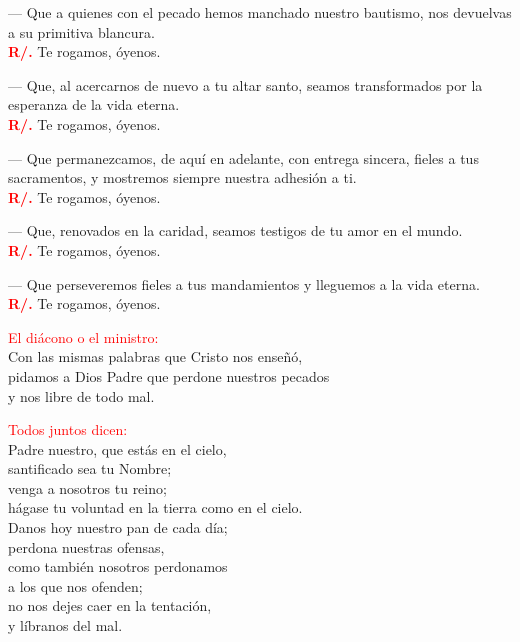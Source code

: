 \documentclass[12pt, letterpaper]{report}
\begin{document}
--- Que a quienes con el pecado hemos manchado nuestro bautismo,
nos devuelvas a su primitiva blancura.\\
\noindent
\Large {\bfseries \textcolor{red}{R/.}} \hspace{0.5cm} Te rogamos, \'oyenos.

--- Que, al acercarnos de nuevo a tu altar santo, seamos transformados
por la esperanza de la vida eterna.\\
\noindent
\Large {\bfseries \textcolor{red}{R/.}} \hspace{0.5cm} Te rogamos, \'oyenos.

--- Que permanezcamos, de aqu\'i en adelante, con entrega sincera, fieles a tus sacramentos, y mostremos siempre nuestra adhesi\'on a ti.\\
\noindent
\Large {\bfseries \textcolor{red}{R/.}} \hspace{0.5cm} Te rogamos, \'oyenos.

--- Que, renovados en la caridad, seamos testigos de tu amor en el
mundo.\\
\noindent
\Large {\bfseries \textcolor{red}{R/.}} \hspace{0.5cm} Te rogamos, \'oyenos.

--- Que perseveremos fieles a tus mandamientos y lleguemos a la vida
eterna.\\
\noindent
\Large {\bfseries \textcolor{red}{R/.}} \hspace{0.5cm} Te rogamos, \'oyenos.

\newpage

\large {\textcolor{red}{El di\'acono o el ministro:}}\\
\Large {Con las mismas palabras que Cristo nos ense\~n\'o,\\
pidamos a Dios Padre que perdone nuestros pecados\\
y nos libre de todo mal.}

\large {\textcolor{red}{Todos juntos dicen:}}\\
\Large {Padre nuestro, que est\'as en el cielo,\\
santificado sea tu Nombre;\\
venga a nosotros tu reino;\\
h\'agase tu voluntad en la tierra como en el cielo.\\
Danos hoy nuestro pan de cada d\'ia;\\
perdona nuestras ofensas,\\
como tambi\'en nosotros perdonamos\\
a los que nos ofenden;\\
no nos dejes caer en la tentaci\'on,\\
y l\'ibranos del mal.}
\end{document}
